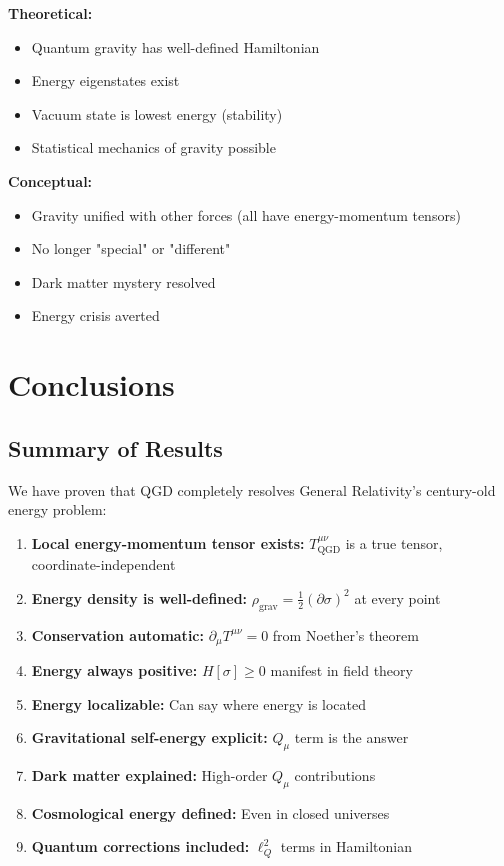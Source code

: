 \documentclass[11pt,a4paper]{article}
\theoremstyle{definition}
\theoremstyle{remark}
\begin{document}
	\textbf{Theoretical:}
	\begin{itemize}
		\item Quantum gravity has well-defined Hamiltonian
		\item Energy eigenstates exist
		\item Vacuum state is lowest energy (stability)
		\item Statistical mechanics of gravity possible
	\end{itemize}
	
	\textbf{Conceptual:}
	\begin{itemize}
		\item Gravity unified with other forces (all have energy-momentum tensors)
		\item No longer "special" or "different"
		\item Dark matter mystery resolved
		\item Energy crisis averted
	\end{itemize}
	
	\section{Conclusions}
	
	\subsection{Summary of Results}
	
	We have proven that QGD completely resolves General Relativity's century-old energy problem:
	
	\begin{enumerate}
		\item \textbf{Local energy-momentum tensor exists:} $T^{\mu\nu}_{\text{QGD}}$ is a true tensor, coordinate-independent
		
		\item \textbf{Energy density is well-defined:} $\rho_{\text{grav}} = \frac{1}{2}(\partial\sigma)^2$ at every point
		
		\item \textbf{Conservation automatic:} $\partial_\mu T^{\mu\nu} = 0$ from Noether's theorem
		
		\item \textbf{Energy always positive:} $H[\sigma] \geq 0$ manifest in field theory
		
		\item \textbf{Energy localizable:} Can say where energy is located
		
		\item \textbf{Gravitational self-energy explicit:} $Q_\mu$ term is the answer
		
		\item \textbf{Dark matter explained:} High-order $Q_\mu$ contributions
		
		\item \textbf{Cosmological energy defined:} Even in closed universes
		
		\item \textbf{Quantum corrections included:} $\ell_Q^2$ terms in Hamiltonian
	\end{enumerate}
	
\end{document}
